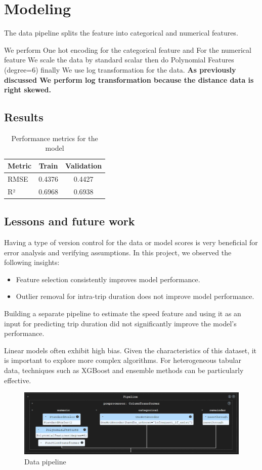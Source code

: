 \section{Modeling}
\hfill \break
The data pipeline splits the feature into categorical and numerical features.

\hfill \break
We perform One hot encoding for the categorical feature and For the numerical feature We scale the data by standard scalar then do Polynomial Features (degree=6) finally We use log transformation for the data.\textbf{ As previously discussed We perform log transformation because the distance data is right skewed.}

\subsection{Results}

\begin{table}[h]
\centering
\begin{tabular}{lcc}
\toprule
\textbf{Metric} & \textbf{Train} & \textbf{Validation} \\
\midrule
RMSE & 0.4376 & 0.4427 \\
R² & 0.6968 & 0.6938 \\
\bottomrule
\end{tabular}
\caption{Performance metrics for the model}
\label{tab:performance}
\end{table}


\subsection{Lessons and future work}

\hfill \break
Having a type of version control for the data or model scores is very beneficial for error analysis and verifying assumptions. In this project, we observed the following insights:

\begin{itemize}
    \item Feature selection consistently improves model performance.
    \item Outlier removal for intra-trip duration does not improve model performance.
\end{itemize}

\hfill \break
Building a separate pipeline to estimate the speed feature and using it as an input for predicting trip duration did not significantly improve the model's performance.

\hfill \break
Linear models often exhibit high bias. Given the characteristics of this dataset, it is important to explore more complex algorithms. For heterogeneous tabular data, techniques such as XGBoost and ensemble methods can be particularly effective.


\newpage
\begin{figure}
    \centering
    \includegraphics[width=1\linewidth]{Data Pipline.png}
    \caption{Data pipeline}
    \label{fig:Data pipeline}
\end{figure}


